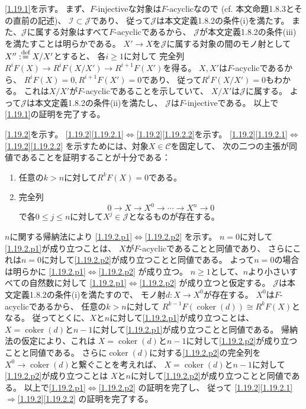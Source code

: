 \documentclass[uplatex,dvipdfmx]{jsarticle}
\makeatletter
\theoremstyle{definition}
\renewenvironment{proof}[1][\proofname]{
  \pushQED{\qed}%
  \normalfont \topsep6\p@\@plus6\p@\relax
  \trivlist
  \item[\hskip\labelsep
    #1\@addpunct{\textbf{.}}]\ignorespaces
}{%
  \popQED\endtrivlist\@endpefalse
}
\providecommand{\proofname}{証明}
\DeclareMathOperator{\coker}{\mathrm{coker}}
\newcommand\mcC{\mathcal{C}}
\newcommand\mcI{\mathcal{I}}
\newcommand\mcJ{\mathcal{J}}
\def\dfn{:\overset{\mbox{{\scriptsize def}}}{=}}
\makeatother
\begin{document}
\begin{proof}
  \ref{1.19.1}を示す。
  まず、\(F\)-injectiveな対象は\(F\)-acyclicなので
  (cf. 本文命題1.8.3とその直前の記述)、
  \(\mcI\subset \mcJ\)であり、
  従って\(\mcJ\)は本文定義1.8.2の条件(i)を満たす。
  また、\(\mcJ\)に属する対象はすべて\(F\)-acyclicであるから、
  \(\mcJ\)が本文定義1.8.2の条件(iii)を満たすことは明らかである。
  \(X'\to X\)を\(\mcJ\)に属する対象の間のモノ射として
  \(X'' \dfn X/X'\)とすると、
  各\(i\geq 1\)に対して
  完全列\(R^iF(X)\to R^iF(X/X')\to R^{i+1}F(X')\)を得る。
  \(X,X'\)は\(F\)-acyclicであるから、
  \(R^iF(X)=0, R^{i+1}F(X')=0\)であり、
  従って\(R^iF(X/X')=0\)もわかる。
  これは\(X/X'\)が\(F\)-acyclicであることを示していて、
  \(X/X'\)は\(\mcJ\)に属する。
  よって\(\mcJ\)は本文定義1.8.2の条件(ii)を満たし、
  \(\mcJ\)は\(F\)-injectiveである。
  以上で\ref{1.19.1}の証明を完了する。

  \ref{1.19.2}を示す。
  \ref{1.19.2}\ref{1.19.2.1}\(\Leftrightarrow\)\ref{1.19.2}\ref{1.19.2.2}を示す。
  \ref{1.19.2}\ref{1.19.2.1}\(\Leftrightarrow\)\ref{1.19.2}\ref{1.19.2.2}
  を示すためには、対象\(X\in \mcC\)を固定して、
  次の二つの主張が同値であることを証明することが十分である：
  \begin{enumerate}
    \item \label{1.19.2.p1}
    任意の\(k > n\)に対して\(R^kF(X) = 0\)である。
    \item \label{1.19.2.p2}
    完全列
    \[
    0 \to X \to X^0 \to \cdots \to X^n \to 0
    \]
    で各\(0\leq j\leq n\)に対して\(X^j\in \mcJ\)となるものが存在する。
  \end{enumerate}
  \(n\)に関する帰納法により
  \ref{1.19.2.p1}\(\Leftrightarrow\)\ref{1.19.2.p2}
  を示す。
  \(n=0\)に対して\ref{1.19.2.p1}が成り立つことは、
  \(X\)が\(F\)-acyclicであることと同値であり、
  さらにこれは\(n=0\)に対して\ref{1.19.2.p2}が成り立つことと同値である。
  よって\(n=0\)の場合は明らかに
  \ref{1.19.2.p1}\(\Leftrightarrow\)\ref{1.19.2.p2}
  が成り立つ。
  \(n\geq 1\)として、\(n\)より小さいすべての自然数に対して
  \ref{1.19.2.p1}\(\Leftrightarrow\)\ref{1.19.2.p2}
  が成り立つと仮定する。
  \(\mcJ\)は本文定義1.8.2の条件(i)を満たすので、
  モノ射\(d:X\to X^0\)が存在する。
  \(X^0\)は\(F\)-acyclicであるから、
  任意の\(k > n\)に対して
  \(R^{k-1}F(\coker(d)) \cong R^kF(X)\)となる。
  従ってとくに、\(X\)と\(n\)に対して\ref{1.19.2.p1}が成り立つことは、
  \(X=\coker(d)\)と\(n-1\)に対して\ref{1.19.2.p1}が成り立つことと同値である。
  帰納法の仮定により、これは
  \(X=\coker(d)\)と\(n-1\)に対して\ref{1.19.2.p2}が成り立つことと同値である。
  さらに\(\coker(d)\)に対する\ref{1.19.2.p2}の完全列を
  \(X^0\to \coker(d)\)と繋ぐことを考えれば、
  \(X=\coker(d)\)と\(n-1\)に対して\ref{1.19.2.p2}が成り立つことは
  \(X\)と\(n\)に対して\ref{1.19.2.p2}が成り立つことと同値である。
  以上で\ref{1.19.2.p1}\(\Leftrightarrow\)\ref{1.19.2.p2}
  の証明を完了し、
  従って
  \ref{1.19.2}\ref{1.19.2.1}\(\Rightarrow\)\ref{1.19.2}\ref{1.19.2.2}
  の証明を完了する。


\end{proof}
\end{document}
